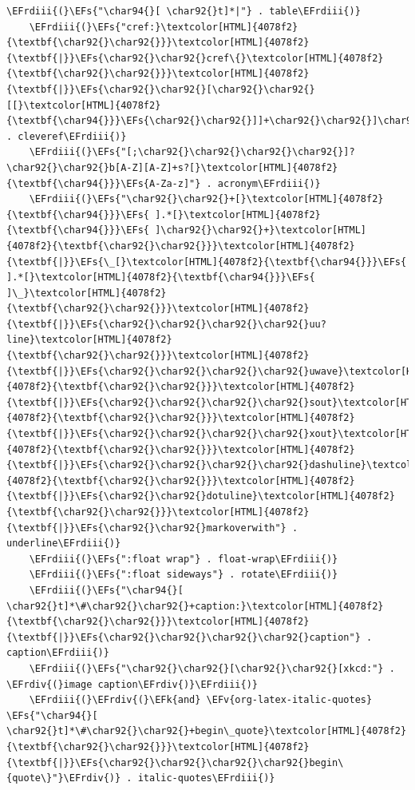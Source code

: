 \documentclass{scrartcl}
\newcommand{\EFk}[1]{\textcolor{EFk}{#1}} %
\newcommand{\EFs}[1]{\textcolor{EFs}{#1}} %
\newcommand{\EFv}[1]{\textcolor{EFv}{#1}} %
\newcommand{\EFrdiii}[1]{\textcolor{EFrdiii}{#1}} %
\newcommand{\EFrdiv}[1]{\textcolor{EFrdiv}{#1}} %
\begin{document}
\begin{Code}
\begin{Verbatim}[]
    \EFrdiii{(}\EFs{"\char94{}[ \char92{}t]*|"} . table\EFrdiii{)}
    \EFrdiii{(}\EFs{"cref:}\textcolor[HTML]{4078f2}{\textbf{\char92{}\char92{}}}\textcolor[HTML]{4078f2}{\textbf{|}}\EFs{\char92{}\char92{}cref\{}\textcolor[HTML]{4078f2}{\textbf{\char92{}\char92{}}}\textcolor[HTML]{4078f2}{\textbf{|}}\EFs{\char92{}\char92{}[\char92{}\char92{}[[}\textcolor[HTML]{4078f2}{\textbf{\char94{}}}\EFs{\char92{}\char92{}]]+\char92{}\char92{}]\char92{}\char92{}]"} . cleveref\EFrdiii{)}
    \EFrdiii{(}\EFs{"[;\char92{}\char92{}\char92{}\char92{}]?\char92{}\char92{}b[A-Z][A-Z]+s?[}\textcolor[HTML]{4078f2}{\textbf{\char94{}}}\EFs{A-Za-z]"} . acronym\EFrdiii{)}
    \EFrdiii{(}\EFs{"\char92{}\char92{}+[}\textcolor[HTML]{4078f2}{\textbf{\char94{}}}\EFs{ ].*[}\textcolor[HTML]{4078f2}{\textbf{\char94{}}}\EFs{ ]\char92{}\char92{}+}\textcolor[HTML]{4078f2}{\textbf{\char92{}\char92{}}}\textcolor[HTML]{4078f2}{\textbf{|}}\EFs{\_[}\textcolor[HTML]{4078f2}{\textbf{\char94{}}}\EFs{ ].*[}\textcolor[HTML]{4078f2}{\textbf{\char94{}}}\EFs{ ]\_}\textcolor[HTML]{4078f2}{\textbf{\char92{}\char92{}}}\textcolor[HTML]{4078f2}{\textbf{|}}\EFs{\char92{}\char92{}\char92{}\char92{}uu?line}\textcolor[HTML]{4078f2}{\textbf{\char92{}\char92{}}}\textcolor[HTML]{4078f2}{\textbf{|}}\EFs{\char92{}\char92{}\char92{}\char92{}uwave}\textcolor[HTML]{4078f2}{\textbf{\char92{}\char92{}}}\textcolor[HTML]{4078f2}{\textbf{|}}\EFs{\char92{}\char92{}\char92{}\char92{}sout}\textcolor[HTML]{4078f2}{\textbf{\char92{}\char92{}}}\textcolor[HTML]{4078f2}{\textbf{|}}\EFs{\char92{}\char92{}\char92{}\char92{}xout}\textcolor[HTML]{4078f2}{\textbf{\char92{}\char92{}}}\textcolor[HTML]{4078f2}{\textbf{|}}\EFs{\char92{}\char92{}\char92{}\char92{}dashuline}\textcolor[HTML]{4078f2}{\textbf{\char92{}\char92{}}}\textcolor[HTML]{4078f2}{\textbf{|}}\EFs{\char92{}\char92{}dotuline}\textcolor[HTML]{4078f2}{\textbf{\char92{}\char92{}}}\textcolor[HTML]{4078f2}{\textbf{|}}\EFs{\char92{}\char92{}markoverwith"} . underline\EFrdiii{)}
    \EFrdiii{(}\EFs{":float wrap"} . float-wrap\EFrdiii{)}
    \EFrdiii{(}\EFs{":float sideways"} . rotate\EFrdiii{)}
    \EFrdiii{(}\EFs{"\char94{}[ \char92{}t]*\#\char92{}\char92{}+caption:}\textcolor[HTML]{4078f2}{\textbf{\char92{}\char92{}}}\textcolor[HTML]{4078f2}{\textbf{|}}\EFs{\char92{}\char92{}\char92{}\char92{}caption"} . caption\EFrdiii{)}
    \EFrdiii{(}\EFs{"\char92{}\char92{}[\char92{}\char92{}[xkcd:"} . \EFrdiv{(}image caption\EFrdiv{)}\EFrdiii{)}
    \EFrdiii{(}\EFrdiv{(}\EFk{and} \EFv{org-latex-italic-quotes} \EFs{"\char94{}[ \char92{}t]*\#\char92{}\char92{}+begin\_quote}\textcolor[HTML]{4078f2}{\textbf{\char92{}\char92{}}}\textcolor[HTML]{4078f2}{\textbf{|}}\EFs{\char92{}\char92{}\char92{}\char92{}begin\{quote\}"}\EFrdiv{)} . italic-quotes\EFrdiii{)}

\end{Verbatim}
\end{Code}
\end{document}
